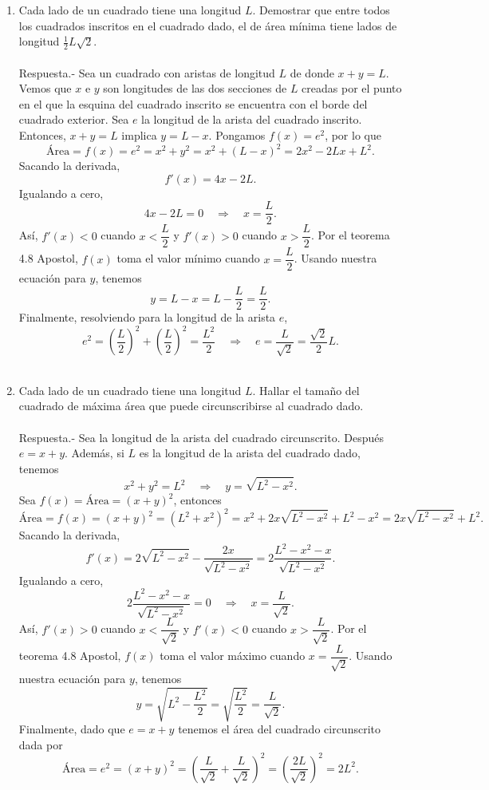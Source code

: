 \begin{enumerate}[\bfseries 1.]
    \item Cada lado de un cuadrado tiene una longitud $L$. Demostrar que entre todos los cuadrados inscritos en el cuadrado dado, el de área mínima tiene lados de longitud $\frac{1}{2}L\sqrt{2}$.\\\\
	Respuesta.-\; Sea un cuadrado con aristas de longitud $L$ de donde $x+y=L$. Vemos que $x$ e $y$ son longitudes de las dos secciones de $L$ creadas por el punto en el que la esquina del cuadrado inscrito se encuentra con el borde del cuadrado exterior. Sea $e$ la longitud de la arista del cuadrado inscrito. Entonces, $x+y=L$ implica $y=L-x$. Pongamos $f(x)=e^2$, por lo que 
	$$\mbox{Área}=f(x)=e^2=x^2+y^2=x^2+(L-x)^2=2x^2-2Lx+L^2.$$
	Sacando la derivada,
	$$f'(x)=4x-2L.$$
	Igualando a cero,
	$$4x-2L=0\quad \Rightarrow \quad x=\dfrac{L}{2}.$$
	Así, $f'(x)<0$ cuando $x<\dfrac{L}{2}$ y $f'(x)>0$ cuando $x>\dfrac{L}{2}$. Por el teorema 4.8 Apostol, $f(x)$ toma el valor mínimo cuando $x=\dfrac{L}{2}$. Usando nuestra ecuación para $y$, tenemos 
	$$y=L-x=L-\dfrac{L}{2}=\dfrac{L}{2}.$$
	Finalmente, resolviendo para la longitud de la arista $e$,
	$$e^2=\left(\dfrac{L}{2}\right)^2+\left(\dfrac{L}{2}\right)^2=\dfrac{L^2}{2} \quad \Rightarrow \quad e=\dfrac{L}{\sqrt{2}}=\dfrac{\sqrt{2}}{2}L.$$\\

    \item Cada lado de un cuadrado tiene una longitud $L$. Hallar el tamaño del cuadrado de máxima área que puede circunscribirse al cuadrado dado.\\\\
	Respuesta.-\; Sea la longitud de la arista del cuadrado circunscrito. Después $e=x+y$. Además, si $L$ es la longitud de la arista del cuadrado dado, tenemos
	$$x^2+y^2=L^2\quad \Rightarrow \quad y=\sqrt{L^2-x^2}.$$
	Sea $f(x)=\mbox{Área}=(x+y)^2$, entonces
	$$\mbox{Área}=f(x)=(x+y)^2=\left(L^2+x^2\right)^2=x^2+2x\sqrt{L^2-x^2}+L^2-x^2=2x\sqrt{L^2-x^2}+L^2.$$
	Sacando la derivada,
	$$f'(x)=2\sqrt{L^2-x^2}-\dfrac{2x}{\sqrt{L^2-x^2}}=2\dfrac{L^2-x^2-x}{\sqrt{L^2-x^2}}.$$
	Igualando a cero,
	$$2\dfrac{L^2-x^2-x}{\sqrt{L^2-x^2}}=0\quad \Rightarrow \quad x=\dfrac{L}{\sqrt{2}}.$$
	Así, $f'(x)>0$ cuando $x<\dfrac{L}{\sqrt{2}}$ y $f'(x)<0$ cuando $x>\dfrac{L}{\sqrt{2}}$. Por el teorema 4.8 Apostol, $f(x)$ toma el valor máximo cuando $x=\dfrac{L}{\sqrt{2}}$. Usando nuestra ecuación para $y$, tenemos
	$$y=\sqrt{L^2-\dfrac{L^2}{2}}=\sqrt{\dfrac{L^2}{2}}=\dfrac{L}{\sqrt{2}}.$$
	Finalmente, dado que $e=x+y$ tenemos el área del cuadrado circunscrito dada por
	$$\mbox{Área}=e^2=(x+y)^2=\left(\dfrac{L}{\sqrt{2}}+\dfrac{L}{\sqrt{2}}\right)^2=\left(\dfrac{2L}{\sqrt{2}}\right)^2=2L^2.$$\\


\end{enumerate}
